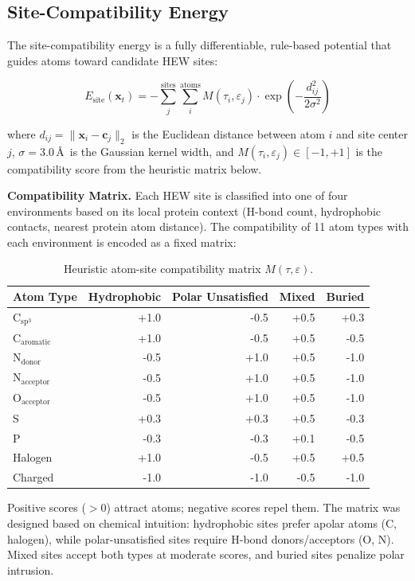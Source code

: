 \subsection{Site-Compatibility Energy}

The site-compatibility energy is a fully differentiable, rule-based
potential that guides atoms toward candidate HEW sites:

\begin{equation}\label{eq:site_energy}
E_{\text{site}}(\mathbf{x}_t) = -\sum_{j}^{\text{sites}} \sum_{i}^{\text{atoms}}
M(\tau_i, \varepsilon_j) \cdot \exp\left(-\frac{d_{ij}^2}{2\sigma^2}\right)
\end{equation}

where $d_{ij} = \|\mathbf{x}_i - \mathbf{c}_j\|_2$ is the Euclidean distance
between atom $i$ and site center $j$, $\sigma=3.0$\,\AA\ is the Gaussian kernel
width, and $M(\tau_i, \varepsilon_j) \in [-1, +1]$ is the compatibility
score from the heuristic matrix below.

\textbf{Compatibility Matrix.}
Each HEW site is classified into one of four environments based on its
local protein context (H-bond count, hydrophobic contacts, nearest protein
atom distance). The compatibility of 11 atom types with each environment
is encoded as a fixed matrix:

\begin{table}[h]
\centering
\caption{Heuristic atom-site compatibility matrix $M(\tau, \varepsilon)$.}
\label{tab:compat_matrix}
\begin{tabular}{lrrrr}
\toprule
Atom Type & Hydrophobic & Polar Unsatisfied & Mixed & Buried \\
\midrule
C$_{\text{sp}^3}$ & +1.0 & -0.5 & +0.5 & +0.3 \\
C$_{\text{aromatic}}$ & +1.0 & -0.5 & +0.5 & -0.5 \\
N$_{\text{donor}}$ & -0.5 & +1.0 & +0.5 & -1.0 \\
N$_{\text{acceptor}}$ & -0.5 & +1.0 & +0.5 & -1.0 \\
O$_{\text{acceptor}}$ & -0.5 & +1.0 & +0.5 & -1.0 \\
S & +0.3 & +0.3 & +0.5 & -0.3 \\
P & -0.3 & -0.3 & +0.1 & -0.5 \\
Halogen & +1.0 & -0.5 & +0.5 & +0.5 \\
Charged & -1.0 & -1.0 & -0.5 & -1.0 \\
\bottomrule
\end{tabular}
\end{table}

Positive scores ($>0$) attract atoms; negative scores repel them.
The matrix was designed based on chemical intuition:
hydrophobic sites prefer apolar atoms (C, halogen), while polar-unsatisfied
sites require H-bond donors/acceptors (O, N). Mixed sites accept both
types at moderate scores, and buried sites penalize polar intrusion.
